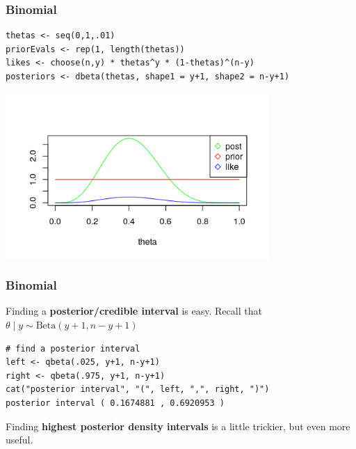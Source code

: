 \documentclass{beamer}
\begin{document}


\begin{frame}[fragile]
\frametitle{Binomial}

\begin{verbatim}
thetas <- seq(0,1,.01)
priorEvals <- rep(1, length(thetas))
likes <- choose(n,y) * thetas^y * (1-thetas)^(n-y)
posteriors <- dbeta(thetas, shape1 = y+1, shape2 = n-y+1)
\end{verbatim}

\begin{center}
\includegraphics[width=100mm]{pics/Rplot}
\end{center}

\end{frame}


\begin{frame}[fragile]
\frametitle{Binomial}

Finding a {\bf posterior/credible interval} is easy. Recall that $\theta \mid y \sim \text{Beta}(y+1, n-y+1)$


\begin{verbatim}
# find a posterior interval
left <- qbeta(.025, y+1, n-y+1)
right <- qbeta(.975, y+1, n-y+1)
cat("posterior interval", "(", left, ",", right, ")")
posterior interval ( 0.1674881 , 0.6920953 )
\end{verbatim}

Finding {\bf highest posterior density intervals} is a little trickier, but even more useful.
\end{frame}

\end{document}
